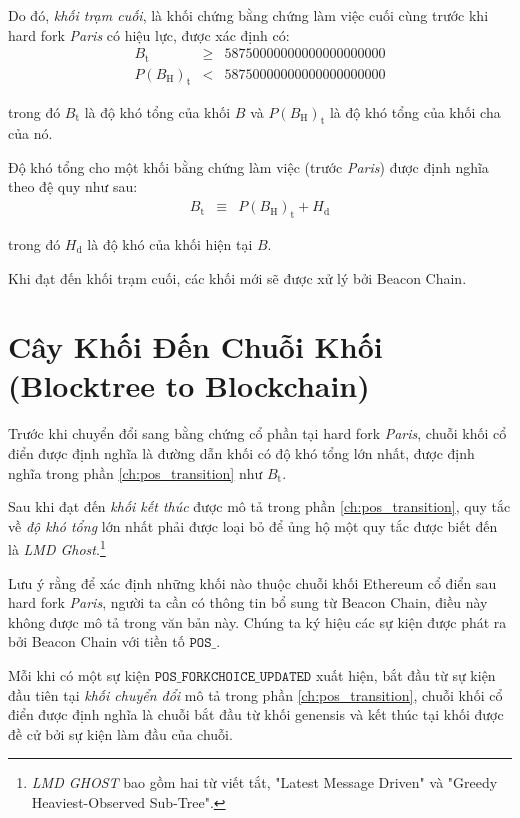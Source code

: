 \documentclass[9pt,oneside]{amsart}
\begin{document}
\begin{multicols}{2}
Do đó, \textit{khối trạm cuối}, là khối chứng bằng chứng làm việc cuối cùng trước khi hard fork \textit{Paris} có hiệu lực, được xác định có:
\begin{eqnarray}
  B_{\mathrm{t}} & \geqslant & 58750000000000000000000 \\
  P(B_{\mathrm{H}})_{\mathrm{t}} & < & 58750000000000000000000
\end{eqnarray}

trong đó $B_{\mathrm{t}}$ là độ khó tổng của khối $B$ và $P(B_{\mathrm{H}})_{\mathrm{t}}$ là độ khó tổng của khối cha của nó.

Độ khó tổng cho một khối bằng chứng làm việc (trước \textit{Paris}) được định nghĩa theo đệ quy như sau:
\begin{eqnarray}
B_{\mathrm{t}} & \equiv & P(B_{\mathrm{H}})_{\mathrm{t}} + H_{\mathrm{d}}
\end{eqnarray}

trong đó $H_{\mathrm{d}}$ là độ khó của khối hiện tại $B$.

Khi đạt đến khối trạm cuối, các khối mới sẽ được xử lý bởi Beacon Chain.

\section{Cây Khối Đến Chuỗi Khối (Blocktree to Blockchain)} \label{ch:blocktree_to_blockchain}

Trước khi chuyển đổi sang bằng chứng cổ phần tại hard fork \textit{Paris}, chuỗi khối cổ điển được định nghĩa là đường dẫn khối có độ khó tổng lớn nhất, được định nghĩa trong phần \ref{ch:pos_transition} như $B_{\mathrm{t}}$.

Sau khi đạt đến \textit{khối kết thúc} được mô tả trong phần \ref{ch:pos_transition}, quy tắc về \textit{độ khó tổng} lớn nhất phải được loại bỏ để ủng hộ một quy tắc được biết đến là \textit{LMD Ghost}.\footnote{\textit{LMD GHOST} bao gồm hai từ viết tắt, "Latest Message Driven" và "Greedy Heaviest-Observed Sub-Tree".}

Lưu ý rằng để xác định những khối nào thuộc chuỗi khối Ethereum cổ điển sau hard fork \textit{Paris}, người ta cần có thông tin bổ sung từ Beacon Chain, điều này không được mô tả trong văn bản này. Chúng ta ký hiệu các sự kiện được phát ra bởi Beacon Chain với tiền tố $\mathtt{POS\_}$.

Mỗi khi có một sự kiện $\mathtt{POS\_FORKCHOICE\_UPDATED}$ xuất hiện, bắt đầu từ sự kiện đầu tiên tại \textit{khối chuyển đổi} mô tả trong phần \ref{ch:pos_transition}, chuỗi khối cổ điển được định nghĩa là chuỗi bắt đầu từ khối genensis và kết thúc tại khối được đề cử bởi sự kiện làm đầu của chuỗi.


\end{multicols}
\end{document}

